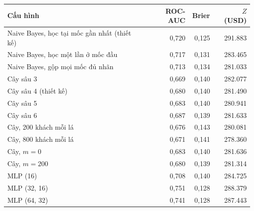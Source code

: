 \begin{tabular}{lrrr}
\toprule
Cấu hình & ROC-AUC & Brier & $Z$ (USD) \\
\midrule
Naive Bayes, học tại mốc gần nhất (thiết kế) & 0,720 & 0,125 & 291.883 \\
Naive Bayes, học một lần ở mốc đầu & 0,717 & 0,131 & 283.465 \\
Naive Bayes, gộp mọi mốc đủ nhãn & 0,713 & 0,134 & 281.033 \\
Cây sâu 3 & 0,669 & 0,140 & 282.077 \\
Cây sâu 4 (thiết kế) & 0,680 & 0,140 & 281.490 \\
Cây sâu 5 & 0,683 & 0,140 & 280.941 \\
Cây sâu 6 & 0,687 & 0,139 & 281.633 \\
Cây, 200 khách mỗi lá & 0,676 & 0,143 & 280.081 \\
Cây, 800 khách mỗi lá & 0,671 & 0,141 & 278.360 \\
Cây, $m=0$ & 0,683 & 0,140 & 281.636 \\
Cây, $m=200$ & 0,680 & 0,139 & 281.314 \\
MLP (16) & 0,708 & 0,140 & 284.725 \\
MLP (32, 16) & 0,751 & 0,128 & 288.379 \\
MLP (64, 32) & 0,741 & 0,128 & 287.443 \\
\bottomrule
\end{tabular}
